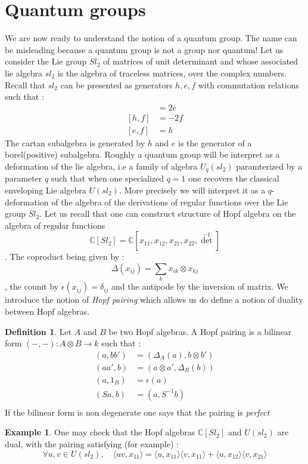\documentclass{article}
\theoremstyle{definition}
\newtheorem{ex}{Example}[section]
\newtheorem{Def}{Definition}[section]
\begin{document}
\section{Quantum groups}
We are now ready to understand the notion of a quantum group. The name can be misleading because a quantum group is not a group nor quantum! Let us consider the Lie group $Sl_2$ of matrices of unit determinant and whose associated lie algebra $sl_2$ is the algebra of traceless matrices, over the complex numbers. Recall that $sl_2$ can be presented as generators $h,e,f$ with commutation relations such that : \begin{align*}
[h,e]&=2e\\
[h,f]&=-2f\\
[e,f]&=h
\end{align*}
The cartan subalgebra is generated by $h$ and $e$ is the generator of a borel(positive) subalgebra. Roughly a quantum group will be interpret as a deformation of the lie algebra, i.e a family of algebra $U_q(sl_2)$ paramterized by a parameter $q$ such that when one specialized $q=1$ one recovers the classical enveloping  Lie algebra $U(sl_2)$. More precisely we will interpret it as a $q$-deformation of the algebra of the  derivations of regular functions over the Lie group $Sl_2$. Let us recall that one can construct structure of Hopf algebra on the algebra of regular functions $$\mathbb{C}[Sl_2]=\mathbb{C}[x_{11},x_{12},x_{21},x_{22},\det^{-1}]$$. The coproduct  being given by : $$\Delta(x_{ij})=\sum_k x_{ik}\otimes x_{kj} $$, the counit by $\epsilon(x_{ij})=\delta_{ij}$ and the antipode by the inversion of matrix. We introduce the notion of \textit{Hopf pairing} which allows us do define a notion of duality between Hopf algebras.\begin{Def}
Let $A$ and $B$ be two Hopf algebras. A Hopf pairing is a bilinear form $(-,-) : A\otimes B\to k$ such that : \begin{align*}
(a,bb')&=(\Delta_A(a),b\otimes b')\\
(aa',b)&=(a\otimes a',\Delta_B(b))\\
(a,1_B)&=\epsilon(a)\\
(Sa,b)&=(a,S^{-1}b)\\
\end{align*}
If the bilinear form is non degenerate one says that the pairing is \textit{perfect}
\begin{ex}\label{classical duality} One may check that the Hopf algebras $\mathbb{C}[Sl_2]$ and $U(sl_2)$ are dual, with the pairing satisfying (for example) : $$\forall u,v\in U(sl_2),\quad \langle uv,x_{11}\rangle = \langle u,x_{11}\rangle\langle v,x_{11}\rangle+\langle u,x_{12}\rangle\langle v,x_{21}\rangle$$
\end{ex}
\end{Def}
\end{document}
